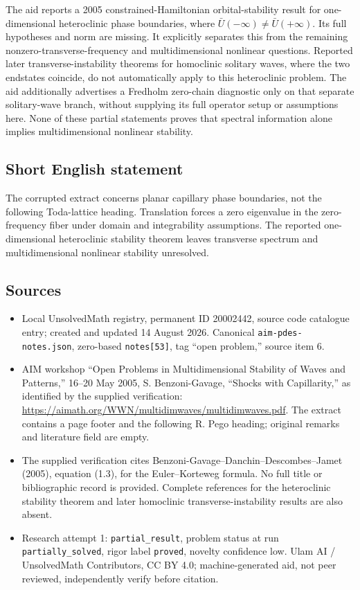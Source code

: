 \documentclass[11pt]{article}
\begin{document}
The aid reports a 2005 constrained-Hamiltonian orbital-stability result for one-dimensional heteroclinic phase boundaries, where $\bar U(-\infty)\ne\bar U(+\infty)$. Its full hypotheses and norm are missing. It explicitly separates this from the remaining nonzero-transverse-frequency and multidimensional nonlinear questions. Reported later transverse-instability theorems for homoclinic solitary waves, where the two endstates coincide, do not automatically apply to this heteroclinic problem. The aid additionally advertises a Fredholm zero-chain diagnostic only on that separate solitary-wave branch, without supplying its full operator setup or assumptions here. None of these partial statements proves that spectral information alone implies multidimensional nonlinear stability.
\subsection{Short English statement}
The corrupted extract concerns planar capillary phase boundaries, not the following Toda-lattice heading. Translation forces a zero eigenvalue in the zero-frequency fiber under domain and integrability assumptions. The reported one-dimensional heteroclinic stability theorem leaves transverse spectrum and multidimensional nonlinear stability unresolved.
\subsection{Sources}
\begin{itemize}
\item Local UnsolvedMath registry, permanent ID 20002442, source code catalogue entry; created and updated 14 August 2026. Canonical \texttt{aim-pdes-notes.json}, zero-based \texttt{notes[53]}, tag ``open problem,'' source item 6.
\item AIM workshop ``Open Problems in Multidimensional Stability of Waves and Patterns,'' 16--20 May 2005, S. Benzoni-Gavage, ``Shocks with Capillarity,'' as identified by the supplied verification: \url{https://aimath.org/WWN/multidimwaves/multidimwaves.pdf}. The extract contains a page footer and the following R. Pego heading; original remarks and literature field are empty.
\item The supplied verification cites Benzoni-Gavage--Danchin--Descombes--Jamet (2005), equation (1.3), for the Euler--Korteweg formula. No full title or bibliographic record is provided. Complete references for the heteroclinic stability theorem and later homoclinic transverse-instability results are also absent.
\item Research attempt 1: \texttt{partial\_result}, problem status at run \texttt{partially\_solved}, rigor label \texttt{proved}, novelty confidence low. Ulam AI / UnsolvedMath Contributors, CC BY 4.0; machine-generated aid, not peer reviewed, independently verify before citation.
\end{itemize}
\end{document}
